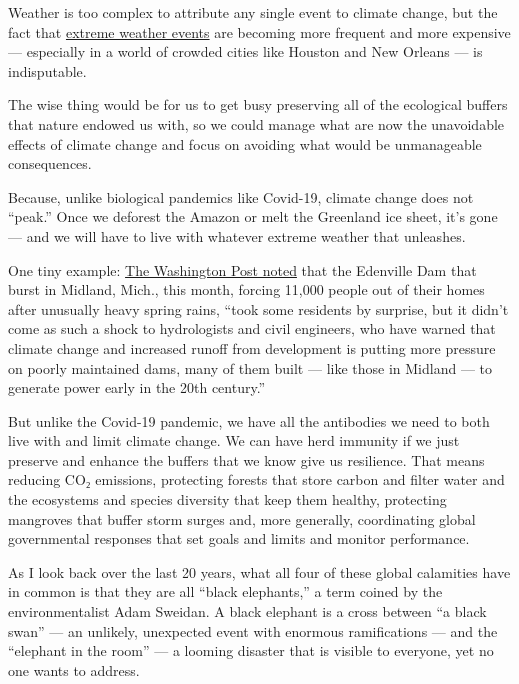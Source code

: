 Weather is too complex to attribute any single event to climate change,
but the fact that
\href{https://www.c2es.org/content/extreme-weather-and-climate-change/}{extreme
weather events} are becoming more frequent and more expensive ---
especially in a world of crowded cities like Houston and New Orleans ---
is indisputable.

The wise thing would be for us to get busy preserving all of the
ecological buffers that nature endowed us with, so we could manage what
are now the unavoidable effects of climate change and focus on avoiding
what would be unmanageable consequences.

Because, unlike biological pandemics like Covid-19, climate change does
not ``peak.'' Once we deforest the Amazon or melt the Greenland ice
sheet, it's gone --- and we will have to live with whatever extreme
weather that unleashes.

One tiny example:
\href{https://www.washingtonpost.com/national/michigan-dam-disaster-infrastructure/2020/05/22/26bc380a-9c34-11ea-ac72-3841fcc9b35f_story.html}{The
Washington Post noted} that the Edenville Dam that burst in Midland,
Mich., this month, forcing 11,000 people out of their homes after
unusually heavy spring rains, ``took some residents by surprise, but it
didn't come as such a shock to hydrologists and civil engineers, who
have warned that climate change and increased runoff from development is
putting more pressure on poorly maintained dams, many of them built ---
like those in Midland --- to generate power early in the 20th century.''

But unlike the Covid-19 pandemic, we have all the antibodies we need to
both live with and limit climate change. We can have herd immunity if we
just preserve and enhance the buffers that we know give us resilience.
That means reducing CO₂ emissions, protecting forests that store carbon
and filter water and the ecosystems and species diversity that keep them
healthy, protecting mangroves that buffer storm surges and, more
generally, coordinating global governmental responses that set goals and
limits and monitor performance.

As I look back over the last 20 years, what all four of these global
calamities have in common is that they are all ``black elephants,'' a
term coined by the environmentalist Adam Sweidan. A black elephant is a
cross between ``a black swan'' --- an unlikely, unexpected event with
enormous ramifications --- and the ``elephant in the room'' --- a
looming disaster that is visible to everyone, yet no one wants to
address.

